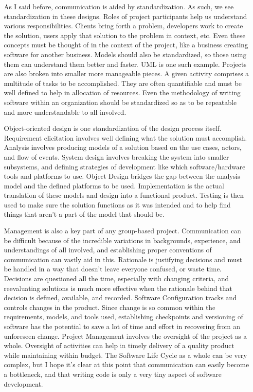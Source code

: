 \documentclass[prb,preprint]{revtex4-2}
\begin{document}
As I said before, communication is aided by standardization. As such, we see standardization in these designs. Roles of project participants help us understand various responsibilities. Clients bring forth a problem, developers work to create the solution, users apply that solution to the problem in context, etc. Even these concepts must be thought of in the context of the project, like a business creating software for another business. Models should also be standardized, so those using them can understand them better and faster. UML is one such example. Projects are also broken into smaller more manageable pieces. A given activity comprises a multitude of tasks to be accomplished. They are often quantifiable and must be well defined to help in allocation of resources. Even the methodology of writing software within an organization should be standardized so as to be repeatable and more understandable to all involved.

Object-oriented design is one standardization of the design process itself. Requirement elicitation involves well defining what the solution must accomplish. Analysis involves producing models of a solution based on the use cases, actors, and flow of events. System design involves breaking the system into smaller subsystems, and defining strategies of development like which software/hardware tools and platforms to use. Object Design bridges the gap between the analysis model and the defined platforms to be used. Implementation is the actual translation of these models and design into a functional product. Testing is then used to make sure the solution functions as it was intended and to help find things that aren't a part of the model that should be.

Management is also a key part of any group-based project. Communication can be difficult because of the incredible variations in backgrounds, experience, and understandings of all involved, and establishing proper conventions of communication can vastly aid in this. Rationale is justifying decisions and must be handled in a way that doesn't leave everyone confused, or waste time. Decisions are questioned all the time, especially with changing criteria, and reevaluating solutions is much more effective when the rationale behind that decision is defined, available, and recorded. Software Configuration tracks and controls changes in the product. Since change is so common within the requirements, models, and tools used, establishing checkpoints and versioning of software has the potential to save a lot of time and effort in recovering from an unforeseen change. Project Management involves the oversight of the project as a whole. Oversight of activities can help in timely delivery of a quality product while maintaining within budget. The Software Life Cycle as a whole can be very complex, but I hope it's clear at this point that communication can easily become a bottleneck, and that writing code is only a very tiny aspect of software development. 
\end{document}
